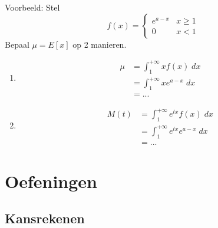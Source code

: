 \documentclass[12pt]{report}
\newcommand{\example}[2]{
      \hrulefill
      
      Voorbeeld: #1
      
      #2
      
      \hrulefill
  }
\begin{document}
\example{Stel $$f(x) = \begin{cases}
                       e^{a - x} & x \geq 1 \\
                       0         & x < 1
                      \end{cases}
$$
Bepaal $\mu = E[x]$ op 2 manieren.}{

\begin{enumerate}
 \item 
  \begin{equation*}
   \begin{split}
    \mu & = \int_{1}^{+\infty} x f(x)\; dx \\
        & = \int_{1}^{+\infty} x e^{a-x}\; dx \\
        & = ...
   \end{split}
  \end{equation*}
 \item
  \begin{equation*}
   \begin{split}
    M(t) & = \int_{1}^{+\infty}e^{tx} f(x)\; dx \\
         & = \int_{1}^{+\infty} e^{tx} e^{a-x}\; dx \\
         & = ...
   \end{split}
  \end{equation*}
\end{enumerate}

}







\part{Oefeningen}
\chapter{Kansrekenen}
  
\end{document}

